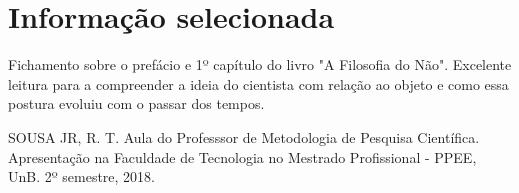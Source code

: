 \documentclass[11pt]{article}
\begin{document}
\section{Informação selecionada}
    Fichamento sobre o prefácio e 1º capítulo do livro "A Filosofia do Não".
    Excelente leitura para a compreender a ideia do cientista com relação ao objeto e como essa postura evoluiu com o passar dos tempos.




	SOUSA JR, R. T. Aula do Professsor de Metodologia de Pesquisa Científica. Apresentação na Faculdade de Tecnologia no Mestrado Profissional - PPEE, UnB. 2º semestre, 2018. 
\end{document}
